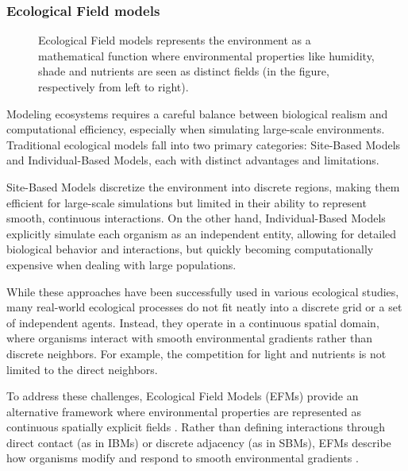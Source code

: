\subsubsection{Ecological Field models}

\begin{figure}[H]
    \centering
    \caption{Ecological Field models represents the environment as a mathematical function where environmental properties like humidity, shade and nutrients are seen as distinct fields (in the figure, respectively from left to right). }
    \label{fig:env-obj_ecological-field-models}    
\end{figure}

Modeling ecosystems requires a careful balance between biological realism and computational efficiency, especially when simulating large-scale environments. Traditional ecological models fall into two primary categories: Site-Based Models and Individual-Based Models, each with distinct advantages and limitations.

Site-Based Models discretize the environment into discrete regions, making them efficient for large-scale simulations but limited in their ability to represent smooth, continuous interactions. On the other hand, Individual-Based Models explicitly simulate each organism as an independent entity, allowing for detailed biological behavior and interactions, but quickly becoming computationally expensive when dealing with large populations.

While these approaches have been successfully used in various ecological studies, many real-world ecological processes do not fit neatly into a discrete grid or a set of independent agents. Instead, they operate in a continuous spatial domain, where organisms interact with smooth environmental gradients rather than discrete neighbors. For example, the competition for light and nutrients is not limited to the direct neighbors.

To address these challenges, Ecological Field Models (EFMs) provide an alternative framework where environmental properties are represented as continuous spatially explicit fields \cite{Wu1985}. Rather than defining interactions through direct contact (as in IBMs) or discrete adjacency (as in SBMs), EFMs describe how organisms modify and respond to smooth environmental gradients \cite{Chng2011b,Seidl2012}.

